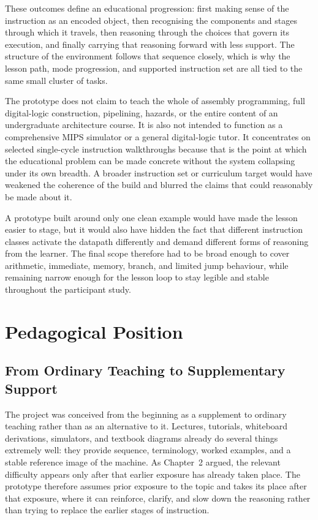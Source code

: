These outcomes define an educational progression: first making sense of the instruction as an encoded object, then recognising the components and stages through which it travels, then reasoning through the choices that govern its execution, and finally carrying that reasoning forward with less support. The structure of the environment follows that sequence closely, which is why the lesson path, mode progression, and supported instruction set are all tied to the same small cluster of tasks.

The prototype does not claim to teach the whole of assembly programming, full digital-logic construction, pipelining, hazards, or the entire content of an undergraduate architecture course. It is also not intended to function as a comprehensive MIPS simulator or a general digital-logic tutor. It concentrates on selected single-cycle instruction walkthroughs because that is the point at which the educational problem can be made concrete without the system collapsing under its own breadth. A broader instruction set or curriculum target would have weakened the coherence of the build and blurred the claims that could reasonably be made about it.

A prototype built around only one clean example would have made the lesson easier to stage, but it would also have hidden the fact that different instruction classes activate the datapath differently and demand different forms of reasoning from the learner. The final scope therefore had to be broad enough to cover arithmetic, immediate, memory, branch, and limited jump behaviour, while remaining narrow enough for the lesson loop to stay legible and stable throughout the participant study.

\section{Pedagogical Position}

\subsection{From Ordinary Teaching to Supplementary Support}

The project was conceived from the beginning as a supplement to ordinary teaching rather than as an alternative to it. Lectures, tutorials, whiteboard derivations, simulators, and textbook diagrams already do several things extremely well: they provide sequence, terminology, worked examples, and a stable reference image of the machine. As Chapter~2 argued, the relevant difficulty appears only after that earlier exposure has already taken place. The prototype therefore assumes prior exposure to the topic and takes its place after that exposure, where it can reinforce, clarify, and slow down the reasoning rather than trying to replace the earlier stages of instruction.

